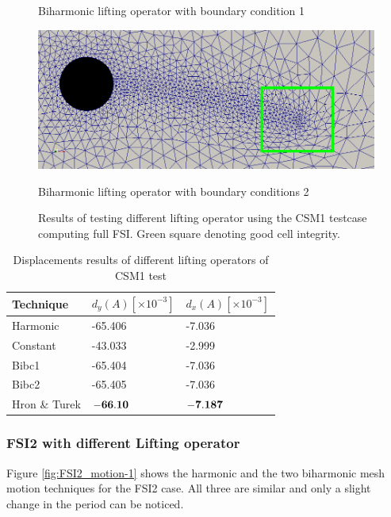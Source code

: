 \begin{figure}[H]
\begin{minipage}[b]{0.6\linewidth}
    \caption{Biharmonic lifting operator with boundary condition 1} 
    \vspace{4ex}
  \end{minipage}%
  \begin{minipage}[b]{0.6\linewidth}
    \centering
    \includegraphics[scale=0.25]{./Mesh_motion_results/CSM1_bibc2_rectangle.png} 
    \caption{Biharmonic lifting operator with boundary conditions 2} 
    \vspace{4ex}
  \end{minipage} 
  \caption{Results of testing different lifting operator using the CSM1 testcase computing full FSI. Green square denoting good cell integrity.}
  \label{fig:CSM1_pictures} 
\end{figure}

\begin{table}[H]
\centering
\caption{Displacements results of different lifting operators of CSM1 test}
\label{tab:comparing lifting}
\begin{tabular}{|l|l|l|}
\hline
Technique & $d_y(A) [\times 10^{-3}]$ & $d_x(A) [\times 10^{-3}]$ \\ \hline
Harmonic & -65.406 & -7.036 \\ \hline
Constant & -43.033 & -2.999 \\ \hline
Bibc1 & -65.404 & -7.036 \\ \hline
Bibc2 & -65.405 & -7.036 \\ \hline
Hron \& Turek & $\bold{-66.10}$& $\bold{-7.187}$\\ \hline
\end{tabular}
\end{table}

\subsubsection{FSI2 with different Lifting operator}

Figure \ref{fig:FSI2_motion-1} shows the harmonic and the two biharmonic mesh motion techniques for the FSI2 case. All three are similar and only a slight change in the period can be noticed.
 

